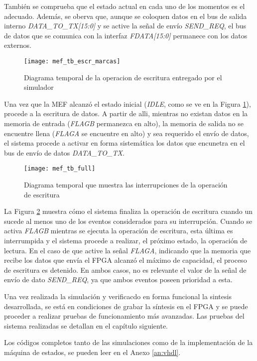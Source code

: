 También se comprueba que el estado actual en cada uno de los momentos es el adecuado. Además, se oberva que, aunque se coloquen datos en el bus de salida interno {\it DATA\_TO\_TX[15:0]} y se active la señal de envío
{\it SEND\_REQ}, el bus de datos que se comunica con la interfaz {\it FDATA[15:0]} permanece con los datos externos.

\begin{figure}[b]
	\centering
	\texttt{[image: mef\_tb\_escr\_marcas]}
	\caption{Diagrama temporal de la operacion de escritura entregado por el simulador}
	\label{tb:escr}
\end{figure}

Una vez que la MEF alcanzó el estado inicial ({\it IDLE}, como se ve en la Figura \ref{tb:escr}), procede a la escritura de datos. A partir de alli, mientras no existan datos en la memoria de entrada ({\it FLAGB} permanezca en alto), la memoria de salida no se encuentre llena ({\it FLAGA} se encuentre en alto) y sea requerido el envío de datos, el sistema procede a activar en forma sistemática los datos que encunetra en el bus de envío de datos {\it DATA\_TO\_TX}.

\begin{figure}[ht]
	\centering
	\texttt{[image: mef\_tb\_full]}
	\caption{Diagrama temporal que muestra las interrupciones de la operación de escritura}
	\label{tb:inter}
\end{figure}

 La Figura \ref{tb:inter} muestra cómo el sistema finaliza la operación de escritura cuando un sucede al menos uno de los eventos considerados para su interrupción. Cuando se activa {\it FLAGB} mientras se ejecuta la operación de escritura, esta última es interrumpida y el sistema procede a realizar, el próximo estado, la operación de lectura. En el caso de que active la señal {\it FLAGA}, indicando que la memoria que recibe los datos que envía el FPGA alcanzó el máximo de capacidad, el proceso de escritura es detenido. En ambos casos, no es relevante el valor de la señal de envío de dato {\it SEND\_REQ}, ya que ambos eventos poseen prioridad a esta.
 
 Una vez realizada la simulación y verificacdo en forma funcional la sintesis desarrollada, se está en condiciones de grabar la síntesis en el FPGA y se puede proceder a realizar pruebas de funcionamiento más avanzadas. Las pruebas del sistema realizadas se detallan en el capítulo siguiente.

Los códigos completos tanto de las simulaciones como de la implementación de la máquina de estados, se pueden leer en el Anexo \ref{an:vhdl}.